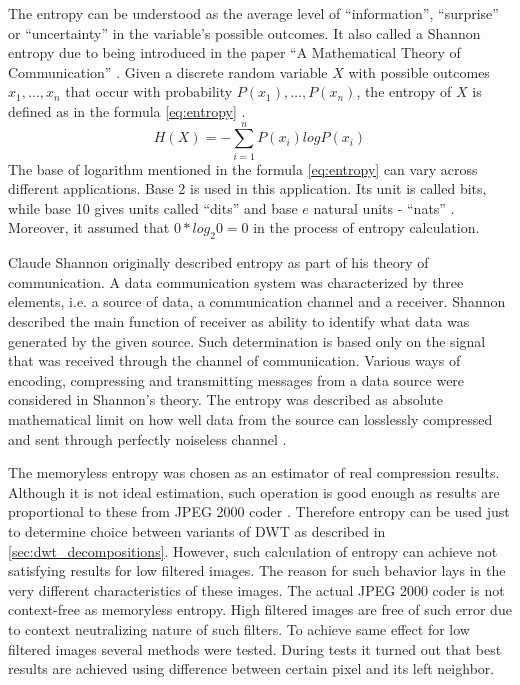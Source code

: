 The entropy can be understood as the average level of ``information'', ``surprise'' or ``uncertainty'' in the variable's
possible outcomes. It also called a Shannon entropy due to being introduced in the paper ``A Mathematical Theory of Communication'' \cite{entropy_wiki}.
Given a discrete random variable $X$ with possible outcomes $x_{1},\dots,x_{n}$ that occur with probability
$P(x_{1}),\dots,P(x_{n})$, the entropy of $X$ is defined as in the formula \ref{eq:entropy} \cite{entropy}.
\begin{equation}
    H(X)=-\sum_{i=1}^{n}P(x_{i})logP(x_{i})
\label{eq:entropy}
\end{equation}
The base of logarithm mentioned in the formula \ref{eq:entropy} can vary across different applications. Base 2 is used
in this application. Its unit is called bits, while base 10 gives units called ``dits'' and base $e$
natural units - ``nats'' \cite{entropy_wiki}. Moreover, it assumed that $0*log_{2}0=0$ in the process of entropy calculation.

Claude Shannon originally described entropy as part of his theory of communication. A data communication system
was characterized by three elements, i.e. a source of data, a communication channel and a receiver. Shannon described
the main function of receiver as ability to identify what data was generated by the given source. Such determination
is based only on the signal that was received through the channel of communication. Various ways of encoding,
compressing and transmitting messages from a data source were considered in Shannon's theory. The entropy was described
as absolute mathematical limit on how well data from the source can losslessly compressed and sent through perfectly
noiseless channel \cite{entropy_wiki}.

The memoryless entropy was chosen as an estimator of real compression results. Although it is not ideal estimation,
such operation is good enough as results are proportional to these from JPEG 2000 coder \cite{entropy}.
Therefore entropy can be used just to determine choice between variants of DWT as described in \ref{sec:dwt_decompositions}.
However, such calculation of entropy can achieve not satisfying results for low filtered images.
The reason for such behavior lays in the very different characteristics of these images. The actual JPEG 2000 coder
is not context-free as memoryless entropy. High filtered images are free of such error due to context neutralizing
nature of such filters. To achieve same effect for low filtered images several methods were tested.
During tests it turned out that best results are achieved using difference between certain pixel and its left neighbor.

